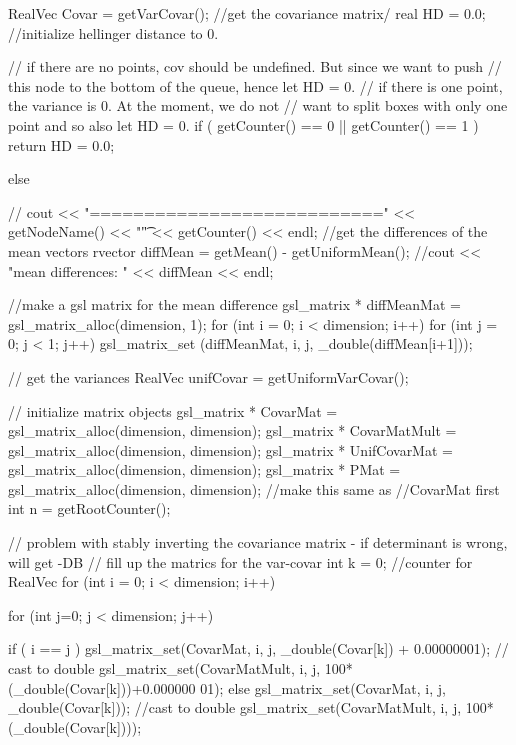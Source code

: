 \begin{DoxyCode}
   {
    RealVec Covar = getVarCovar(); //get the covariance matrix/
    real HD = 0.0; //initialize hellinger distance to 0.

    // if there are no points, cov should be undefined. But since we want to
       push
    // this node to the bottom of the queue, hence let HD = 0.
    // if there is one point, the variance is 0. At the moment, we do not 
    // want to split boxes with only one point and so also let HD = 0.
    if ( getCounter() == 0 || getCounter() == 1 ) { return HD = 0.0; } 

    else {
  //    cout << "===========================" << getNodeName() << "\t" <<
       getCounter() << endl;
      //get the differences of the mean vectors
      rvector diffMean = getMean() - getUniformMean();
      //cout << "mean differences: " << diffMean << endl;

      //make a gsl matrix for the mean difference
      gsl_matrix * diffMeanMat = gsl_matrix_alloc(dimension, 1);
      for (int i = 0; i < dimension; i++) {
        for (int j = 0; j < 1; j++) {
          gsl_matrix_set (diffMeanMat, i, j, _double(diffMean[i+1]));
        }
      }

      // get the variances
      RealVec unifCovar = getUniformVarCovar();

      // initialize matrix objects
      gsl_matrix * CovarMat = gsl_matrix_alloc(dimension, dimension);
      gsl_matrix * CovarMatMult = gsl_matrix_alloc(dimension, dimension);
      gsl_matrix * UnifCovarMat = gsl_matrix_alloc(dimension, dimension);
      gsl_matrix * PMat = gsl_matrix_alloc(dimension, dimension); //make this
       same as
                                              //CovarMat first
      int n = getRootCounter();
    
      // problem with stably inverting the covariance matrix - if determinant
       is wrong, will get -DB
      // fill up the matrics for the var-covar
      int k = 0; //counter for RealVec
      for (int i = 0; i < dimension; i++) {
        for (int j=0; j < dimension; j++) {

          if ( i == j ) {
            gsl_matrix_set(CovarMat, i, j, _double(Covar[k]) + 0.00000001); //
      cast to double
            gsl_matrix_set(CovarMatMult, i, j, 100*(_double(Covar[k]))+0.000000
      01);
          }
          else {
            gsl_matrix_set(CovarMat, i, j, _double(Covar[k])); //cast to double
            gsl_matrix_set(CovarMatMult, i, j, 100*(_double(Covar[k])));
          }
          
}}}}
\end{DoxyCode}
